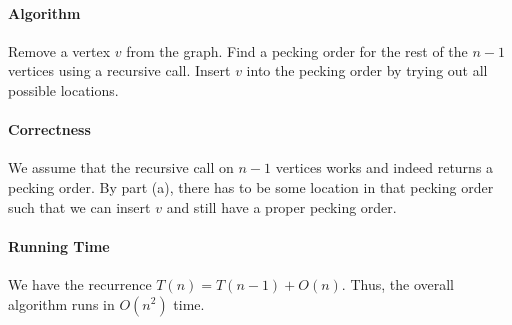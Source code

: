 \documentclass{article}
\begin{document}
\begin{enumerate}
\begin{enumerate}
\paragraph{Algorithm}
Remove a vertex $v$ from the graph. Find a pecking order for the rest of the $n - 1$ vertices using a recursive call. Insert $v$ into the pecking order by trying out all possible locations.

\paragraph{Correctness}
We assume that the recursive call on $n - 1$ vertices works and indeed returns a pecking order. By part (a), there has to be some location in that pecking order such that we can insert $v$ and still have a proper pecking order.

\paragraph{Running Time}
We have the recurrence $T(n) = T(n - 1) + O(n)$. Thus, the overall algorithm runs in $O(n^2)$ time.
\end{enumerate}

\end{enumerate}
\end{document}
